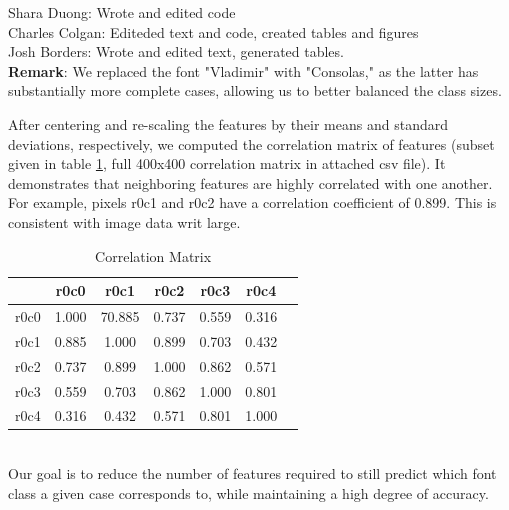 \documentclass{homework}
\begin{document}
\maketitle
Shara Duong: Wrote and edited code \\
Charles Colgan: Editeded text and code, created tables and figures\\
Josh Borders: Wrote and edited text, generated tables. \\

\textbf{Remark}: We replaced the font "Vladimir" with "Consolas," as the latter has substantially more complete cases, allowing us to better balanced the class sizes.

After centering and re-scaling the features by their means and standard deviations, respectively, we computed the correlation matrix of features (subset given in table \ref{tab:CORR}, full 400x400 correlation matrix in attached csv file). It demonstrates that neighboring features are highly correlated with one another. For example, pixels r0c1 and r0c2 have a correlation coefficient of 0.899. This is consistent with image data writ large. 
\begin{table}[h]
    \centering
    \begin{tabular}{c|cccccc}
      &r0c0&r0c1&r0c2&r0c3&r0c4\\
      \hline
r0c0&1.000&70.885&0.737&0.559&0.316\\
r0c1&0.885&1.000&0.899&0.703&0.432\\
r0c2&0.737&0.899&1.000&0.862&0.571\\
r0c3&0.559&0.703&0.862&1.000&0.801\\
r0c4&0.316&0.432&0.571&0.801&1.000
    \end{tabular}
    \caption{Correlation Matrix}
    \label{tab:CORR}
\end{table}
\\Our goal is to reduce the number of features required to still predict which font class a given case corresponds to, while maintaining a high degree of accuracy.
\end{document}
